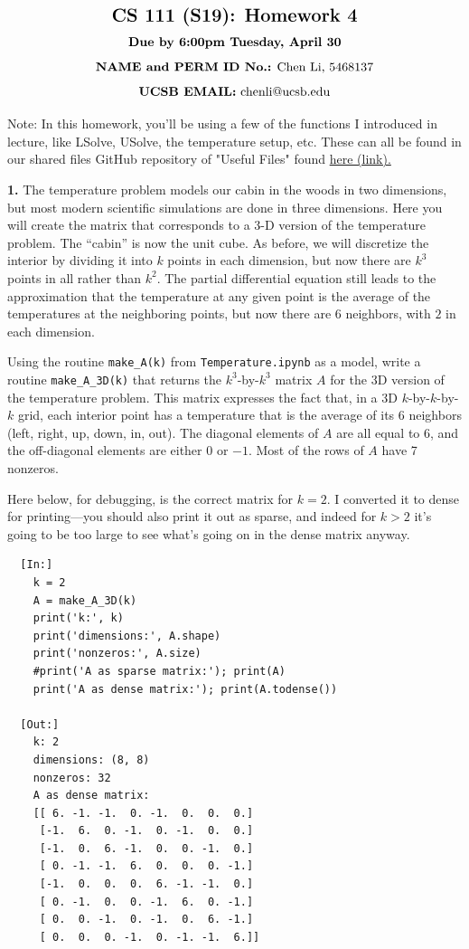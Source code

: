 \documentclass[11pt]{article}
\begin{document}
$$\mbox{\Large \textbf {CS 111 (S19): Homework 4}}$$
$$\mbox{\textbf {Due by 6:00pm Tuesday, April 30}}$$
$$\mbox{\textbf {NAME and PERM ID No.:} Chen Li, 5468137}$$
$$\mbox{\textbf {UCSB EMAIL:} chenli@ucsb.edu}$$

Note: In this homework, you'll be using a few of the functions I introduced in lecture, 
like LSolve, USolve, the temperature setup, etc. These can all be found in our shared 
files GitHub repository of "Useful Files" found
\href{https://github.com/ucsb-cs111/s19-lecture-files/tree/master/UsefulFiles}
{here (link).}

\par\bigskip
{\bf 1.}
The temperature problem models our cabin in the woods in two dimensions,
but most modern scientific simulations are done in three dimensions.
Here you will create the matrix that corresponds to a 3-D version of 
the temperature problem. The ``cabin'' is now the unit cube. As before,
we will discretize the interior by dividing it into $k$ points in each
dimension, but now there are $k^3$ points in all rather than $k^2$.
The partial differential equation still leads to the approximation
that the temperature at any given point is the average of the temperatures
at the neighboring points, but now there are 6 neighbors, 
with $2$ in each dimension.

Using the routine {\tt make\_A(k)} from {\tt Temperature.ipynb} as a model, 
write a routine {\tt make\_A\_3D(k)} that returns the $k^3$-by-$k^3$ 
matrix $A$ for the 3D version of the temperature problem.
This matrix expresses the fact that, in a 3D $k$-by-$k$-by-$k$ grid, 
each interior point has a temperature that is the average of its 6 neighbors 
(left, right, up, down, in, out).
The diagonal elements of $A$ are all equal to $6$, 
and the off-diagonal elements are either $0$ or $-1$.
Most of the rows of $A$ have 7 nonzeros.

Here below, for debugging, is the correct matrix for $k=2$.
I converted it to dense for printing---you should also
print it out as sparse, and indeed for $k>2$ it's going to be too
large to see what's going on in the dense matrix anyway.

\begin{verbatim}
  [In:]
    k = 2
    A = make_A_3D(k)
    print('k:', k)
    print('dimensions:', A.shape)
    print('nonzeros:', A.size)
    #print('A as sparse matrix:'); print(A)
    print('A as dense matrix:'); print(A.todense())

  [Out:]
    k: 2
    dimensions: (8, 8)
    nonzeros: 32
    A as dense matrix:
    [[ 6. -1. -1.  0. -1.  0.  0.  0.]
     [-1.  6.  0. -1.  0. -1.  0.  0.]
     [-1.  0.  6. -1.  0.  0. -1.  0.]
     [ 0. -1. -1.  6.  0.  0.  0. -1.]
     [-1.  0.  0.  0.  6. -1. -1.  0.]
     [ 0. -1.  0.  0. -1.  6.  0. -1.]
     [ 0.  0. -1.  0. -1.  0.  6. -1.]
     [ 0.  0.  0. -1.  0. -1. -1.  6.]]
\end{verbatim}
\end{document}
